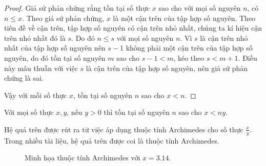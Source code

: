 \begin{proof}
    Giả sử phản chứng rằng tồn tại số thực $x$ sao cho với mọi số nguyên $n$, có $n\leq x$. Theo giả sử phản chứng, $x$ là một cận trên của tập hợp số nguyên. Theo tiên đề về cận trên, tập hợp số nguyên có cận trên nhỏ nhất, chúng ta kí hiệu cận trên nhỏ nhất đó là $s$. Do đó $n\leq s$ với mọi số nguyên $n$. Vì $s$ là cận trên nhỏ nhất của tập hợp số nguyên nên $s - 1$ không phải một cận trên của tập hợp số nguyên, do đó tồn tại số nguyên $m$ sao cho $s - 1 < m$, kéo theo $s < m + 1$. Điều này mâu thuẫn với việc $s$ là cận trên của tập hợp số nguyên, nên giả sử phản chứng là sai.

    Vậy với mỗi số thực $x$, tồn tại số nguyên $n$ sao cho $x < n$.
\end{proof}

\begin{corollary}
    Với mọi số thực $x, y$, nếu $y > 0$ thì tồn tại số nguyên $n$ sao cho $x < ny$.
\end{corollary}

Hệ quả trên được rút ra từ việc áp dụng thuộc tính Archimedes cho số thực $\frac{x}{y}$. Trong nhiều tài liệu, hệ quả trên được coi là thuộc tính Archimedes.

\begin{figure}[htp]
    \centering
    \caption{Minh họa thuộc tính Archimedes với $x = 3.14$.}
\end{figure}

